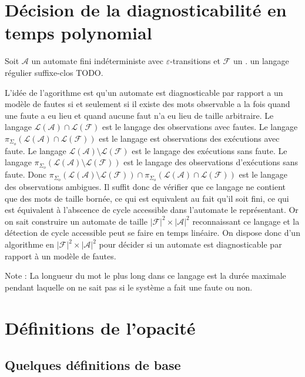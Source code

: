 \documentclass[10pt,a4paper]{article}
\begin{document}
\section{D\'ecision de la diagnosticabilit\'e en temps polynomial}

Soit $\mathcal A$ un automate fini ind\'eterministe avec $\varepsilon$-transitions et $\mathcal F$ un . un langage r\'egulier suffixe-clos TODO.

L'id\'ee de l'agorithme est qu'un automate est diagnosticable par rapport a un mod\`ele de fautes si et seulement si il existe des mots observable a la fois quand une faute a eu lieu et quand aucune faut n'a eu lieu de taille arbitraire. Le langage $\mathcal L (\mathcal A) \cap \mathcal L(\mathcal F)$ est le langage des observations avec fautes. Le langage $\pi_{\Sigma_o}(\mathcal L (\mathcal A) \cap \mathcal L(\mathcal F))$ est le langage est observations des ex\'ecutions avec faute. Le langage $\mathcal L(\mathcal A) \setminus \mathcal L(\mathcal F)$ est le langage des ex\'ecutions sans faute. Le langage $\pi_{\Sigma_o}(\mathcal L(\mathcal A) \setminus \mathcal L(\mathcal F))$ est le langage des observations d'ex\'ecutions sans faute. Donc $\pi_{\Sigma_o}(\mathcal L(\mathcal A) \setminus \mathcal L(\mathcal F)) \cap \pi_{\Sigma_o}(\mathcal L (\mathcal A) \cap \mathcal L(\mathcal F))$ est le langage des observations ambigues. Il suffit donc de v\'erifier que ce langage ne contient que des mots de taille born\'ee, ce qui est equivalent au fait qu'il soit fini, ce qui est \'equivalent \`a l'abscence de cycle accessible dans l'automate le repr\'esentant. Or on sait construire un automate de taille $|\mathcal F|^2 \times |\mathcal A|^2$ reconnaissant ce langage et la d\'etection de cycle accessible peut se faire en temps lin\'eaire. On dispose donc d'un algorithme en $|\mathcal F|^2 \times |\mathcal A|^2$ pour d\'ecider si un automate est diagnosticable par rapport \`a un mod\`ele de fautes.

Note : La longueur du mot le plus long dans ce langage est la dur\'ee maximale pendant laquelle on ne sait pas si le syst\`eme a fait une faute ou non.


\section{D\'efinitions de l'opacit\'e}

\subsection{Quelques d\'efinitions de base}
\end{document}
